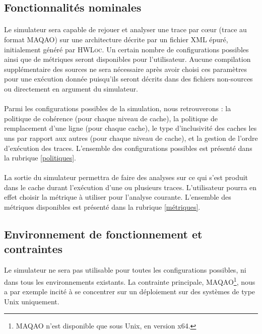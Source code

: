 \subsection{Fonctionnalités nominales}

\paragraph{}
Le simulateur sera capable de rejouer et analyser une trace par c\oe ur (trace au format \textsc{MAQAO}) sur une architecture décrite par un fichier XML épuré, initialement généré par \textsc{HWLoc}. Un certain nombre de configurations possibles ainsi que de métriques seront disponibles pour l'utilisateur. Aucune compilation supplémentaire des sources ne sera nécessaire après avoir choisi ces paramètres pour une exécution donnée puisqu'ils seront décrits dans des fichiers non-sources ou directement en argument du simulateur. 

\paragraph{}
Parmi les configurations possibles de la simulation, nous retrouverons : la politique de cohérence (pour chaque niveau de cache), la politique de remplacement d'une ligne (pour chaque cache), le type d'inclusivité des caches les uns par rapport aux autres (pour chaque niveau de cache), et la gestion de l'ordre d'exécution des traces. L'ensemble des configurations possibles est présenté dans la rubrique \ref{politiques}.

\paragraph{}
La sortie du simulateur permettra de faire des analyses sur ce qui s'est produit dans le cache durant l'exécution d'une ou plusieurs traces. L'utilisateur pourra en effet choisir la métrique à utiliser pour l'analyse courante. L'ensemble des métriques disponibles est présenté dans la rubrique \ref{métriques}. 

\newpage

\subsection{Environnement de fonctionnement et contraintes}

Le simulateur ne sera pas utilisable pour toutes les configurations possibles, ni dans tous les environnements existants. La contrainte principale, \textsc{MAQAO}\footnote{MAQAO n'est disponible que sous Unix, en version x64.}, nous a par exemple incité à se concentrer sur un déploiement sur des systèmes de type Unix uniquement. 


